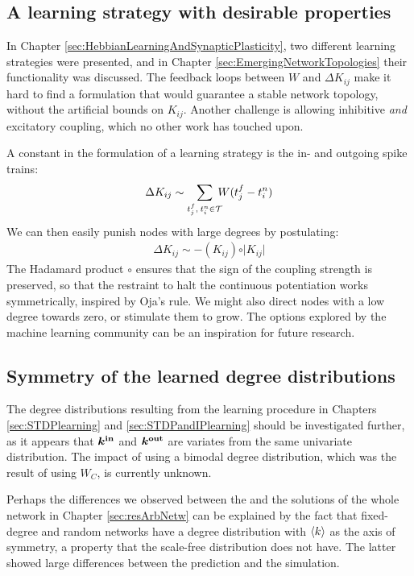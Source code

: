 \subsection{A learning strategy with desirable properties}
In Chapter \ref{sec:HebbianLearningAndSynapticPlasticity}, two different learning strategies were presented, and in Chapter \ref{sec:EmergingNetworkTopologies} their functionality was discussed. The feedback loops between $W$ and $\Delta K_{ij}$ make it hard to find a formulation that would guarantee a stable network topology, without the artificial bounds on $K_{ij}$. Another challenge is allowing inhibitive \textsl{and} excitatory coupling, which no other work has touched upon.

A constant in the formulation of a learning strategy is the in- and outgoing spike trains: 
\begin{align}
\Delta K_{ij} \sim \sum_{t_{j}^{f}, \: t_i^{n} \in \mathcal{T}} \hspace{-2mm} W (t_{j}^{f}-t_i^{n} )
\end{align}
We can then easily punish nodes with large degrees by postulating:
\begin{align}
\Delta K_{ij} \sim - (K_{ij}) \circ \rvert K_{ij} \rvert
\end{align}
The Hadamard product $\circ$ ensures that the sign of the coupling strength is preserved, so that the restraint to halt the continuous potentiation works symmetrically, inspired by Oja's rule\cite{ChrolCannon2014}. We might also direct nodes with a low degree towards zero, or stimulate them to grow. The options explored by the machine learning community can be an inspiration for future research.


\subsection{Symmetry of the learned degree distributions}
The degree distributions resulting from the learning procedure in Chapters \ref{sec:STDPlearning} and \ref{sec:STDPandIPlearning} should be investigated further, as it appears that ${\boldsymbol{k^{\rm in}}}$ and $\boldsymbol{{k^{\rm out}}}$ are variates from the same univariate distribution. The impact of using a bimodal degree distribution, which was the result of using $W_C$, is currently unknown.

Perhaps the differences we observed between the \MFR and the solutions of the whole network in Chapter \ref{sec:resArbNetw} can be explained by the fact that fixed-degree and random networks have a degree distribution with ${\langle k\rangle}$ as the axis of symmetry, a property that the scale-free distribution does not have. The latter showed large differences between the prediction and the simulation.


